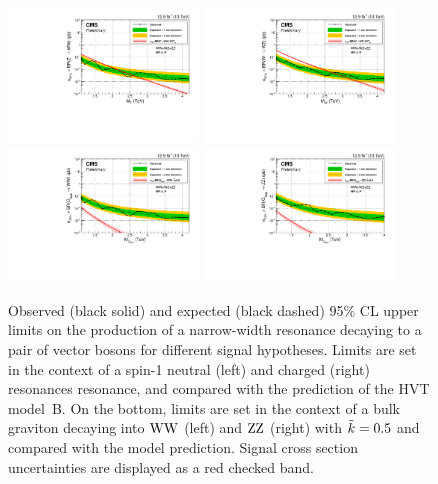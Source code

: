 \begin{figure}[h!]
\centering
     \includegraphics[width=0.45\textwidth]{figures/analysis/search2/B2G-16-021/figures/limits/brazilianFlag_ZprimeWW_new_combined_13TeV.pdf}
     \includegraphics[width=0.45\textwidth]{figures/analysis/search2/B2G-16-021/figures/limits/brazilianFlag_WZ_new_combined_13TeV.pdf}\\
     \includegraphics[width=0.45\textwidth]{figures/analysis/search2/B2G-16-021/figures/limits/brazilianFlag_BulkWW_new_combined_13TeV.pdf}
     \includegraphics[width=0.45\textwidth]{figures/analysis/search2/B2G-16-021/figures/limits/brazilianFlag_BulkZZ_new_combined_13TeV.pdf}
\caption{Observed (black solid) and expected (black dashed) 95\% CL upper limits on the production of a narrow-width resonance decaying to a pair of vector bosons for different signal hypotheses. 
Limits are set in the context of a spin-1 neutral \PZpr (left) and charged \PWpr (right) resonances resonance, and compared with the prediction of the HVT model~B. On the bottom, limits are set in the context of a bulk graviton decaying into $\mathrm{W}\mathrm{W}$ (left) and $\mathrm{Z}\mathrm{Z}$ (right) with $\tilde{k} =0.5$ and compared with the model prediction. Signal cross section uncertainties are displayed as a red checked band.
}
\label{fig:searchII:limitCombined}
\end{figure}

